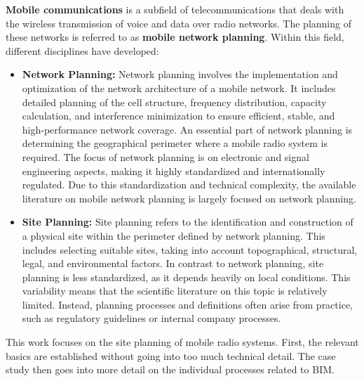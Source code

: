 \begin{English}
    \textbf{Mobile communications} is a subfield of telecommunications that deals with the wireless transmission of voice and data over radio networks. The planning of these networks is referred to as \textbf{mobile network planning}. Within this field, different disciplines have developed:

    \begin{itemize}
        \item \textbf{Network Planning:} Network planning involves the implementation and optimization of the network architecture of a mobile network. It includes detailed planning of the cell structure, frequency distribution, capacity calculation, and interference minimization to ensure efficient, stable, and high-performance network coverage. An essential part of network planning is determining the geographical perimeter where a mobile radio system is required.
        The focus of network planning is on electronic and signal engineering aspects, making it highly standardized and internationally regulated. Due to this standardization and technical complexity, the available literature on mobile network planning is largely focused on network planning.

        \item \textbf{Site Planning:} Site planning refers to the identification and construction of a physical site within the perimeter defined by network planning. This includes selecting suitable sites, taking into account topographical, structural, legal, and environmental factors.
        In contrast to network planning, site planning is less standardized, as it depends heavily on local conditions. This variability means that the scientific literature on this topic is relatively limited. Instead, planning processes and definitions often arise from practice, such as regulatory guidelines or internal company processes.
    \end{itemize}

    This work focuses on the site planning of mobile radio systems. First, the relevant basics are established without going into too much technical detail. The case study then goes into more detail on the individual processes related to BIM.
\end{English}


